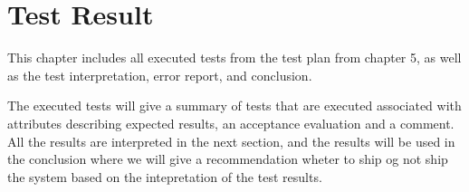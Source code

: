 \chapter{Test Result}

	This chapter includes all executed tests from the test plan from chapter 5, as well
	as the test interpretation, error report, and conclusion. 
	
	The executed tests will give a summary of tests that are executed associated with
	attributes describing expected results, an acceptance evaluation and a comment. 
	All the results are interpreted in the next section, and the results will be used
	in the conclusion where we will give a recommendation wheter to ship og not ship
	the system based on the intepretation of the test results. 

	\clearpage

